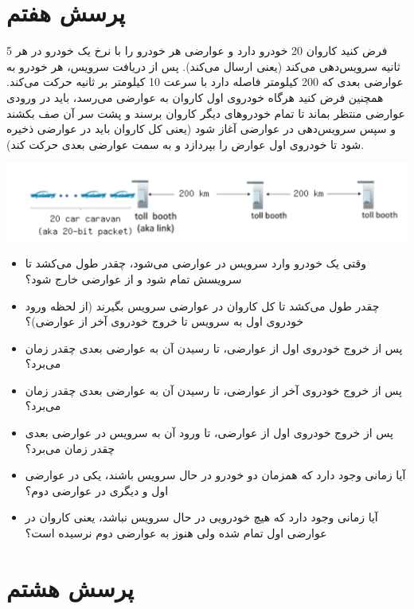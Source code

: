 \section*{پرسش هفتم}


فرض کنید کاروان 20 خودرو دارد و عوارضی هر خودرو را با نرخ یک خودرو در هر 5 ثانیه سرویس‌دهی می‌کند (یعنی ارسال می‌کند). پس از دریافت سرویس، هر خودرو به عوارضی بعدی که 200 کیلومتر فاصله دارد با سرعت 10 کیلومتر بر ثانیه حرکت می‌کند. همچنین فرض کنید هرگاه خودروی اول کاروان به عوارضی می‌رسد، باید در ورودی عوارضی منتظر بماند تا تمام خودروهای دیگر کاروان برسند و پشت سر آن صف بکشند و سپس سرویس‌دهی در عوارضی آغاز شود (یعنی کل کاروان باید در عوارضی ذخیره شود تا خودروی اول عوارض را بپردازد و به سمت عوارضی بعدی حرکت کند).


\begin{center}
	\includegraphics[width=1\linewidth]{images/screenshot003}
\end{center}


\begin{itemize}
	\item وقتی یک خودرو وارد سرویس در عوارضی می‌شود، چقدر طول می‌کشد تا سرویسش تمام شود و از عوارضی خارج شود؟
	\item چقدر طول می‌کشد تا کل کاروان در عوارضی سرویس بگیرند (از لحظه ورود خودروی اول به سرویس تا خروج خودروی آخر از عوارضی)؟
	\item پس از خروج خودروی اول از عوارضی، تا رسیدن آن به عوارضی بعدی چقدر زمان می‌برد؟
	\item پس از خروج خودروی آخر از عوارضی، تا رسیدن آن به عوارضی بعدی چقدر زمان می‌برد؟
	\item پس از خروج خودروی اول از عوارضی، تا ورود آن به سرویس در عوارضی بعدی چقدر زمان می‌برد؟
	\item آیا زمانی وجود دارد که همزمان دو خودرو در حال سرویس باشند، یکی در عوارضی اول و دیگری در عوارضی دوم؟ 
	\item آیا زمانی وجود دارد که هیچ خودرویی در حال سرویس نباشد، یعنی کاروان در عوارضی اول تمام شده ولی هنوز به عوارضی دوم نرسیده است؟
\end{itemize}

\section*{پرسش هشتم}


